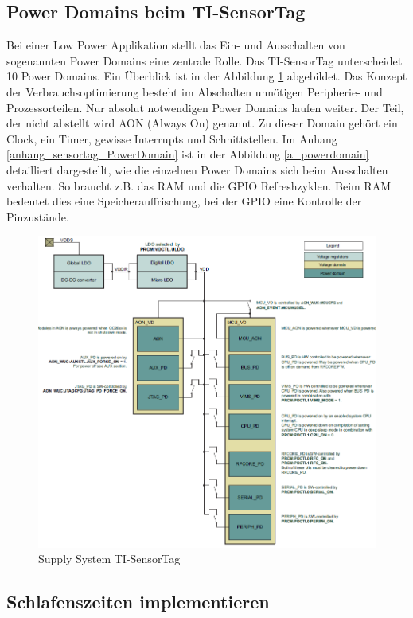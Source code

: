 \subsection{Power Domains beim TI-SensorTag}
\label{PowerDomains}

Bei einer Low Power Applikation stellt das Ein- und Ausschalten von sogenannten Power Domains eine zentrale Rolle. Das TI-SensorTag unterscheidet 10 Power Domains. Ein Überblick  ist in der Abbildung  \ref{supply_syst} abgebildet. Das Konzept der Verbrauchsoptimierung besteht im Abschalten unnötigen Peripherie- und Prozessorteilen. Nur absolut notwendigen Power Domains laufen weiter. Der Teil, der nicht abstellt wird AON (Always On) genannt. Zu dieser Domain gehört ein Clock, ein Timer, gewisse Interrupts und Schnittstellen. Im Anhang \ref{anhang_sensortag_PowerDomain} ist in der Abbildung \ref{a_powerdomain} detailliert dargestellt, wie die einzelnen Power Domains sich beim Ausschalten verhalten. So braucht z.B. das RAM und die GPIO Refreshzyklen. Beim RAM bedeutet dies eine Speicherauffrischung, bei der GPIO eine Kontrolle der Pinzustände.

\clearpage
\begin{figure}[ht]
  \includegraphics[width=1.0\textwidth]{3Vorgehen/imag/powerdomain_1.png}
  \caption{Supply System TI-SensorTag}
  \label{supply_syst}
\end{figure}


\subsection{Schlafenszeiten implementieren}
\label{sleep_funktion}

